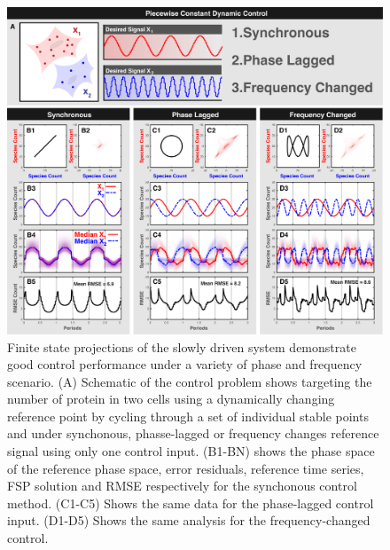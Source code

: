 \documentclass[12pt]{article}
\begin{document}
\begin{figure}
\begin{center}
\includegraphics[width=1\textwidth]{DynamicControl.pdf}
\vspace{-0.1in}
\caption{Finite state projections of the slowly driven system demonstrate good control performance under a variety of phase and frequency scenario. (A) Schematic of the control problem shows targeting the number of protein in two cells using a dynamically changing reference point by cycling through a set of individual stable points and under synchonous, phasse-lagged or frequency changes reference signal using only one control input. (B1-BN) shows the phase space of the reference phase space, error residuals, reference time series, FSP solution and RMSE respectively for the synchonous control method. (C1-C5) Shows the same data for the phase-lagged control input. (D1-D5) Shows the same analysis for the frequency-changed control.}
\label{CR}
\end{center}
\vspace{-0.2in}
\end{figure}
\end{document}
